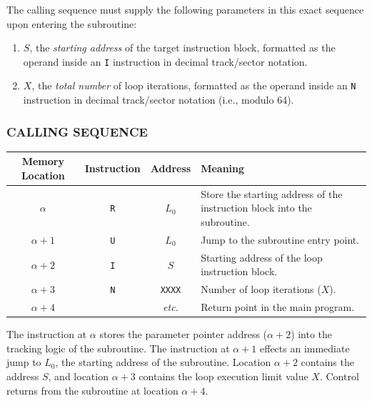 The calling sequence must supply the following parameters in this exact sequence upon entering the subroutine:
\begin{enumerate}
    \item $S$, the \emph{starting address} of the target instruction block, formatted as the operand inside an \texttt{I} instruction in decimal track/sector notation.
    \item $X$, the \emph{total number} of loop iterations, formatted as the operand inside an \texttt{N} instruction in decimal track/sector notation (i.e., modulo 64).
\end{enumerate}

\subsubsection*{CALLING SEQUENCE}
\begin{table}[h!]
\centering
\begin{tabularx}{\textwidth}{cccX}
\toprule
\textbf{Memory Location} & \textbf{Instruction} & \textbf{Address} & \textbf{Meaning} \\
\midrule
$\alpha$     & \texttt{R} & $L_0$                   & Store the starting address of the instruction block into the subroutine. \\
$\alpha+1$         & \texttt{U} & $L_0$                   & Jump to the subroutine entry point. \\
$\alpha+2$         & \texttt{I} & $S$                     & Starting address of the loop instruction block. \\
$\alpha+3$         & \texttt{N} & \texttt{XXXX}           & Number of loop iterations ($X$). \\
$\alpha+4$         &            & \textit{etc.}           & Return point in the main program. \\
\bottomrule
\end{tabularx}
\end{table}

The instruction at $\alpha$ stores the parameter pointer address ($\alpha+2$) into the tracking logic of the subroutine. The instruction at $\alpha+1$ effects an immediate jump to $L_0$, the starting address of the subroutine. Location $\alpha+2$ contains the address $S$, and location $\alpha+3$ contains the loop execution limit value $X$. Control returns from the subroutine at location $\alpha+4$.

